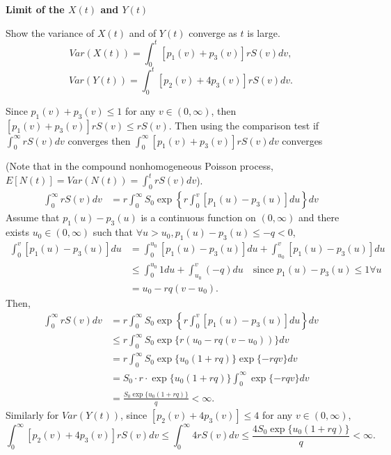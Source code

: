 \documentclass[10pt]{article}
\begin{document}
\textbf{Limit of the $X(t)$ and $Y(t)$}

Show the variance of $X(t)$ and of $Y(t)$ converge as $t$ is large.
$$Var(X(t)) = \int_0^t [p_1(v)+p_3(v)] r S(v) dv,$$
$$Var(Y(t)) = \int_0^t [p_2(v) + 4p_3(v)] r S(v) dv.$$

Since $p_1(v) + p_3(v) \leq 1$ for any $v \in (0, \infty)$, then $[p_1(v)+p_3(v)] r S(v) \leq rS(v)$. Then using the comparison test if $\int_0^\infty r S(v) dv$ converges then $\int_0^\infty [p_1(v)+p_3(v)] r S(v) dv$ converges

(Note that in the compound nonhomogeneous Poisson process, $E[N(t)] = Var(N(t)) = \int_0^t r S(v) dv$).
\begin{equation}
\begin{split}
\int_0^\infty r S(v) dv & = r \int_0^\infty S_0 \exp \left\{ r \int_0^v [p_1(u) - p_3(u)] du \right\} dv
\end{split}
\end{equation}
Assume that $p_1(u) - p_3(u)$ is a continuous function on $(0, \infty)$ and there exists $u_0 \in (0, \infty)$ such that $\forall u>u_0, p_1(u) - p_3(u) \leq -q < 0$,
\begin{equation}
\begin{split}
\int_0^v [p_1(u) - p_3(u)] du  &= \int_0^{u_0}  [p_1(u) - p_3(u)] du  + \int_{u_0}^{v}  [p_1(u) - p_3(u)] du  \\
& \leq  \int_0^{u_0}  1 du + \int_{u_0}^{v} (-q) du  \quad \text{since $p_1(u)-p_3(u) \leq 1 \forall u$} \\
& = u_0 - rq(v-u_0).
\end{split}
\end{equation}
Then,
\begin{equation}
\begin{split}
\int_0^\infty r S(v) dv & = r \int_0^\infty S_0 \exp \left\{ r \int_0^v [p_1(u) - p_3(u)] du \right\} dv \\
& \leq r \int_0^\infty S_0 \exp \{r ( u_0 - rq(v-u_0))\} dv \\
& = r \int_0^\infty S_0 \exp\{u_0 (1+rq)\} \exp\{-rqv\}dv \\
& = S_0 \cdot r \cdot \exp\{u_0 (1+rq)\} \int_0^\infty\exp\{-rqv\}dv \\
& = \frac{S_0 \exp\{u_0 (1+rq)\}}{q} < \infty.
\end{split}
\end{equation}
Similarly for $Var(Y(t))$, since $[p_2(v) + 4p_3(v)] \leq 4$ for any $v \in (0, \infty)$,
$$ \int_0^\infty [p_2(v) + 4p_3(v)] r S(v) dv \leq \int_0^\infty 4 r S(v) dv  \leq \frac{4 S_0 \exp\{u_0 (1+rq)\}}{q} < \infty.$$
\end{document}
